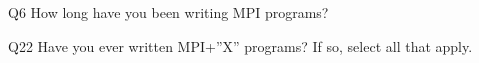 \begin{description}%
\item{Q6} How long have you been writing MPI programs?%
\item{Q22} Have you ever written MPI+”X” programs? If so, select all that apply.%
\end{description}%
